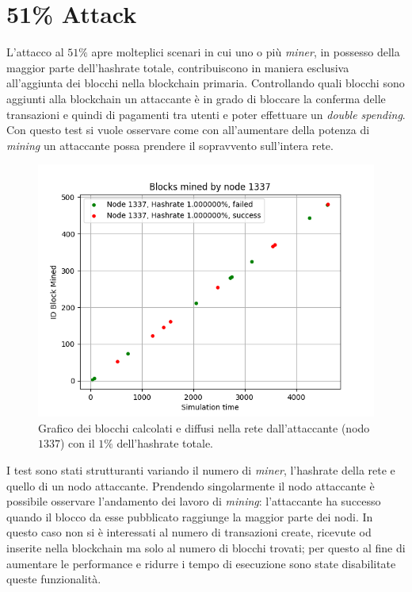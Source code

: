 \section{51\% Attack}
L'attacco al $51\%$ apre molteplici scenari in cui uno o più \textit{miner}, in possesso della maggior parte dell'hashrate totale, contribuiscono in maniera esclusiva all'aggiunta dei blocchi nella blockchain primaria. Controllando quali blocchi sono aggiunti alla blockchain un attaccante è in grado di bloccare la conferma delle transazioni e quindi di pagamenti tra utenti e poter effettuare un \textit{double spending}.\newline
Con questo test si vuole osservare come con all'aumentare della potenza di \textit{mining} un attaccante possa prendere il sopravvento sull'intera rete.\newline
\begin{figure}[H]
    \centering
    \includegraphics[width=\textwidth]{./images/1337-test-51-1.png}
    \caption{Grafico dei blocchi calcolati e diffusi nella rete dall'attaccante (nodo $1337$) con il $1\%$ dell'hashrate totale.}
    \label{fig:51v1.1}
\end{figure}
I test sono stati strutturanti variando il numero di \textit{miner}, l'hashrate della rete e quello di un nodo attaccante. Prendendo singolarmente il nodo attaccante è possibile osservare l'andamento dei lavoro di \textit{mining}: l'attaccante ha successo quando il blocco da esse pubblicato raggiunge la maggior parte dei nodi. In questo caso non si è interessati al numero di transazioni create, ricevute od inserite nella blockchain ma solo al numero di blocchi trovati; per questo al fine di aumentare le performance e ridurre i tempo di esecuzione sono state disabilitate queste funzionalità.\newline
